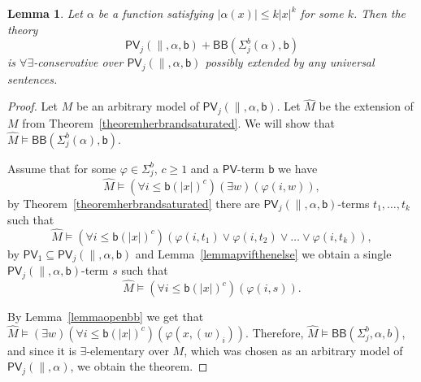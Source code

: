 \documentclass[11pt]{article}
\newcommand{\PV}{\mathsf{PV}}
\newcommand{\bd}{\mathsf{b}}
\newcommand{\abs}[1]{\lvert #1 \rvert}
\newtheorem{lemma}[theorem]{Lemma}
\theoremstyle{definition}
\theoremstyle{definition}
\theoremstyle{remark}
\begin{document}
\begin{lemma}\label{lemmapvbbconservativity}
    Let $\alpha$ be a function satisfying $\abs{\alpha(x)}\leq k\abs{x}^k$ for some $k$. Then the theory \[\PV_j(\parallel,\alpha,\bd)+\mathsf{BB}(\Sigma^b_{j}(\alpha),\bd)\] is $\forall\exists$-conservative over $\PV_j(\parallel,\alpha,\bd)$ possibly extended by any universal sentences.
\end{lemma}
\begin{proof}
    Let $M$ be an arbitrary model of $\PV_j(\parallel,\alpha,\bd)$. Let $\hat M$ be the extension of $M$ from Theorem~\ref{theoremherbrandsaturated}. We will show that $\hat M\models \mathsf{BB}(\Sigma^b_j(\alpha),\bd)$.

    Assume that for some $\varphi\in \Sigma^b_j$, $c\geq 1$ and a $\PV$-term $\bd$ we have
    \[\hat M \models (\forall i\leq \bd(\abs{x})^c)(\exists w)(\varphi(i,w)),\]
    by Theorem~\ref{theoremherbrandsaturated} there are $\PV_j(\parallel,\alpha,\bd)$-terms $t_1,\dots,t_k$ such that
    \[\hat M \models (\forall i\leq \bd(\abs{x})^c)(\varphi(i,t_1)\lor \varphi(i,t_2)\lor \dots \lor \varphi(i,t_k)),\]
    by $\PV_1\subseteq \PV_j(\parallel,\alpha,\bd)$ and Lemma~\ref{lemmapvifthenelse} we obtain a single $\PV_j(\parallel,\alpha,\bd)$-term $s$ such that \[\hat M \models (\forall i\leq \bd(\abs{x})^c)(\varphi(i,s)).\] 

    By Lemma~\ref{lemmaopenbb} we get that $\hat M \models (\exists w)(\forall i\leq \bd(\abs{x})^{c})(\varphi(x,(w)_i))$. Therefore, $\hat M\models \mathsf{BB}(\Sigma^b_j,\alpha,b)$, and since it is $\exists$-elementary over $M$, which was chosen as an arbitrary model of $\PV_j(\parallel,\alpha)$, we obtain the theorem.
\end{proof}
\end{document}

